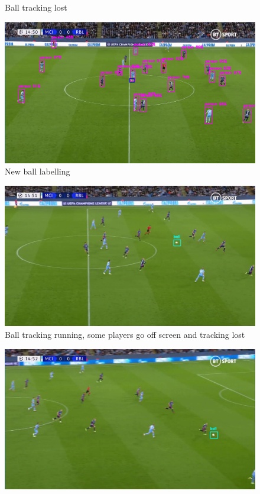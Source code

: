\documentclass[
    11pt,
    twoside
]{report}
\begin{document}
\begin{appendices}
\begin{figure}[H]
    \caption{Ball tracking lost}
    \label{img:5}
\end{figure}
\begin{figure}[H]
    \includegraphics[keepaspectratio, width=\columnwidth]{Screenshot_2022-03-03_21-36-47.png}
    \caption{New ball labelling}
    \label{img:6}
\end{figure}
\begin{figure}[H]
    \includegraphics[keepaspectratio, width=\columnwidth]{Screenshot_2022-03-03_23-05-49.png}
    \caption{Ball tracking running, some players go off screen and tracking lost}
    \label{img:7}
\end{figure}
\begin{figure}[H]
    \includegraphics[keepaspectratio, width=\columnwidth]{Screenshot_2022-03-03_23-06-03.png}

\end{figure}
\end{appendices}
\end{document}
